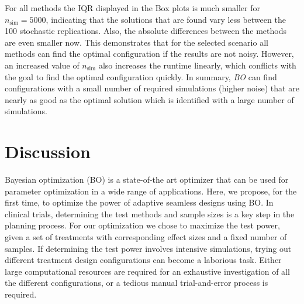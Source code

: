\documentclass[bimj,fleqn]{w-art}
\theoremstyle{plain}
\theoremstyle{definition}
\begin{document}
For all methods the IQR displayed in the Box plots is much smaller for $n_\text{sim} = 5000$, indicating that the solutions that are found vary less between the 100 stochastic replications.
Also, the absolute differences between the methods are even smaller now.
This demonstrates that for the selected scenario all methods can find the optimal configuration if the results are not noisy.
However, an increased value of $n_\text{sim}$ also increases the runtime linearly, which conflicts with the goal to find the optimal configuration quickly.
In summary, \emph{BO} can find configurations with a small number of required simulations (higher noise) that are nearly as good as the optimal solution which is identified with a large number of simulations.





\section{Discussion}
\label{sec:discussion}

Bayesian optimization (BO) is a state-of-the art optimizer that can be used for parameter optimization in a wide range of applications.
Here, we propose, for the first time, to optimize the power of adaptive seamless designs using BO.
In clinical trials, determining the test methods and sample sizes is a key step in the planning process.
For our optimization we chose to maximize the test power, given a set of treatments with corresponding effect sizes and a fixed number of samples.
If determining the test power involves intensive simulations, trying out different treatment design configurations can become a laborious task.
Either large computational resources are required for an exhaustive investigation of all the different configurations, or a tedious manual trial-and-error process is required.
\end{document}

